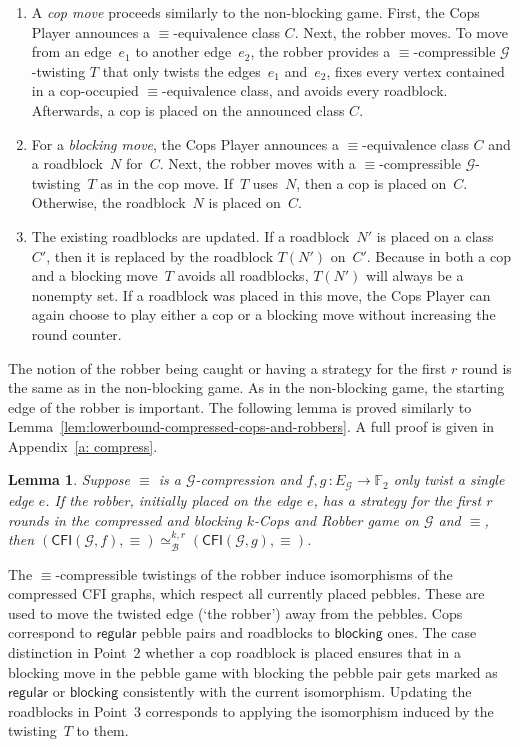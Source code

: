 \documentclass[10pt,a4paper]{article}
\newcommand{\defining}[1]{\emph{#1}}
\newcommand{\regular}{\mathsf{regular}}
\newcommand{\blocking}{\mathsf{blocking}}
\newcommand{\comp}{\equiv}
\newcommand{\CFIsym}{\mathsf{CFI}}
\newcommand{\CFI}[1]{\CFIsym(#1)}
\newcommand{\precompCFI}[2]{{(\CFI{#1},#2)}}
\newcommand{\FF}{\mathbb{F}}
\newcommand{\graphG}{\mathcal{G}}
\newcommand{\edgeG}{E_{\graphG}}
\newcommand{\kbequivr}[2]{\simeq_{\mathcal{B}}^{#1,#2}}
\newtheorem{lemma}[theorem]{Lemma}
\newcommand{\ifAppendix}[1]{#1}
\begin{document}
\begin{enumerate}
        \item A \defining{cop move} proceeds similarly to the non-blocking game.
        First, the Cops Player announces a $\comp$-equivalence class $C$.
        Next, the robber moves.
        To move from an edge~$e_1$ to another edge~$e_2$, the robber provides a $\comp$\nobreakdash-compressible $\graphG$\nobreakdash-twisting $T$ that
        only twists the edges~$e_1$ and~$e_2$,
        fixes every vertex contained in a cop-occupied $\comp$\nobreakdash-equivalence class, and
        avoids every roadblock.
        Afterwards, a cop is placed on the announced class $C$.
        \item For a \defining{blocking move}, 
        the Cops Player announces a $\comp$-equivalence class $C$ and a roadblock~$N$ for~$C$. 
        Next, the robber moves with a $\comp$\nobreakdash-compressible $\graphG$\nobreakdash-twisting~$T$ as in the cop move.
        If~$T$ uses~$N$, then a cop is placed on~$C$.
        Otherwise, the roadblock~$N$ is placed on~$C$.
        \item 
        The existing roadblocks are updated.
        If a roadblock~$N'$ is placed on a class~$C'$,
        then it is replaced by the roadblock $T(N')$ on~$C'$.
        Because in both a cop and a blocking move~$T$ avoids all roadblocks, $T(N')$ will always be a nonempty set.
        If a roadblock was placed in this move,
        the Cops Player can again choose to play either a cop or a blocking move 
        without increasing the round counter. 
\end{enumerate}
The notion of the robber being caught or having a strategy for the first $r$ round is the same as in the non-blocking game.
As in the non-blocking game, the starting edge of the robber is important.
The following lemma is proved similarly to Lemma~\ref{lem:lowerbound-compressed-cops-and-robbers}.
\ifAppendix{A full proof is given in Appendix~\ref{a: compress}.}

\begin{lemma}
        \label{lem:robber-to-duplictor-blocking}
        Suppose $\comp$ is a $\graphG$-compression and 
        $f,g \, \colon \edgeG \to \FF_2$ only twist a single edge $e$.
        If the robber, initially placed on the edge $e$, has a strategy for the first $r$ rounds in the compressed and blocking $k$-Cops and Robber game
        on $\graphG$ and $\comp$, then
        $\precompCFI{\graphG,f}{\comp} \kbequivr{k}{r} \precompCFI{\graphG,g}{\comp}$.
\end{lemma}
The $\comp$\nobreakdash-compressible twistings of the robber
induce isomorphisms of the compressed CFI graphs, which respect all currently placed pebbles.
These are used to move the twisted edge (`the robber') away from the pebbles.
Cops correspond to $\regular$ pebble pairs and roadblocks to $\blocking$ ones. The case distinction in Point~2 whether a cop roadblock is placed
ensures that in a blocking move in the pebble game with blocking the pebble pair gets marked as $\regular$ or $\blocking$ consistently with the current isomorphism.
Updating the roadblocks in Point~3 corresponds to applying the isomorphism induced by the twisting~$T$ to them. 
\end{document}
